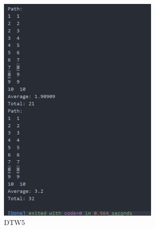 \documentclass[12pt,a4paper]{article}
\theoremstyle{definition}
\begin{document}
\begin{appendices}
\begin{figure}[H] %
\centering %
\includegraphics[width=0.7\textwidth]{6.png} %
\caption{DTW5} %
\label{} %
\end{figure}


\end{appendices}
	
\end{document}
